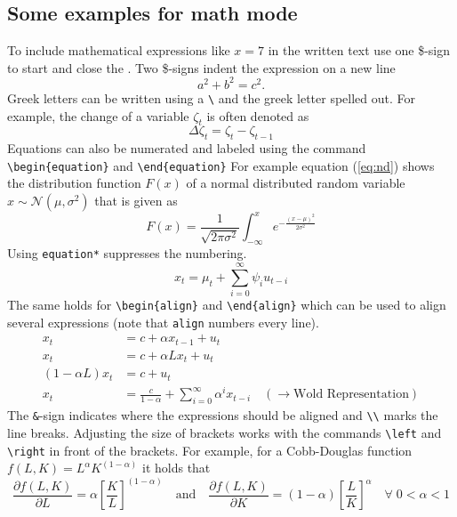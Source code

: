 \documentclass[12pt]{article}
\begin{document}
\subsection{Some examples for math mode}
To include mathematical expressions like $x = 7$ in the written text use one \$-sign to start and close the . Two \$-signs indent the expression on a new line $$a^2 + b^2 = c^2.$$ Greek letters can be written using a \texttt{\textbackslash} and the greek letter spelled out. For example, the change of a variable $\zeta_t$ is often denoted as
$$ \Delta \zeta_t = \zeta_t - \zeta_{t-1}$$
 Equations can also be numerated and labeled using the command \texttt{\textbackslash begin\{equation\}} and \texttt{\textbackslash end\{equation\}} For example equation (\ref{eq:nd}) shows the distribution function $F(x)$ of a normal distributed random variable $x \sim \mathcal{N}(\mu,\sigma^2)$ that is given as
\begin{equation}\label{eq:nd}
	F(x) = \frac{1}{\sqrt{2\pi \sigma^2}}\int_{-\infty}^{x}e^{-\frac{(x-\mu)^2}{2\sigma^2}}
\end{equation}
Using \texttt{equation*} suppresses the numbering.
\begin{equation*}
x_t = \mu_t + \sum_{i=0}^{\infty}\psi_i u_{t-i}
\end{equation*}
The same holds for \texttt{\textbackslash begin\{align\}} and \texttt{\textbackslash end\{align\}} which can be used to align several expressions (note that \texttt{align} numbers every line).
\begin{align*}
x_t &= c + \alpha x_{t-1} + u_t \\
x_t &= c + \alpha Lx_t + u_t  \\
(1-\alpha L)x_t &= c + u_t \\
x_t &= \frac{c}{1-\alpha} + \sum_{i=0}^{\infty}\alpha^ix_{t-i} \quad (\longrightarrow \text{Wold Representation})
\end{align*}
The \texttt{\&}-sign indicates where the expressions should be aligned and \texttt{\textbackslash \textbackslash} marks the line breaks.
Adjusting the size of brackets works with the commands \texttt{\textbackslash left} and \texttt{\textbackslash right} in front of the brackets. For example, for a Cobb-Douglas function $f(L,K) = L^{\alpha}K^{(1-\alpha)}$ it holds that
\begin{equation}
	\frac{\partial f(L,K)}{\partial L} = \alpha \left[\frac{K}{L}\right]^{(1-\alpha)} \quad \text{and} \quad \frac{\partial f(L,K)}{\partial K} = (1-\alpha)\left[\frac{L}{K}\right]^{\alpha} \quad \forall \; 0 < \alpha < 1
\end{equation}
\end{document}
